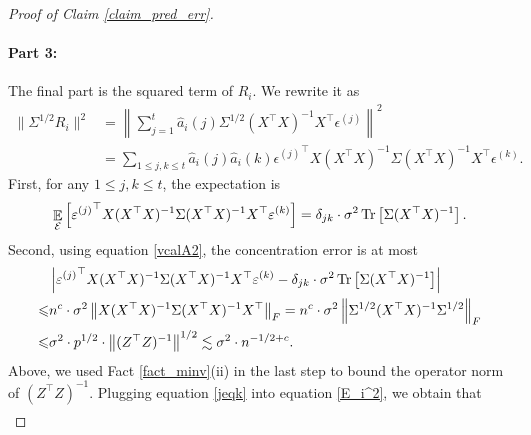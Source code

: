 \begin{proof}[Proof of Claim \ref{claim_pred_err}]
	\paragraph{Part 3:} The final part is the squared term of $R_i$. We rewrite it as
	\begin{align}
	\|\Sigma^{1/2}R_i\|^2 &= \left\|\sum_{j=1}^t \hat{a}_i(j) \Sigma^{1/2}(X^{\top} X)^{-1} X^{\top} \epsilon^{(j)}\right\|^2 \nonumber\\
	& = \sum_{1\le j , k \le t}\hat a_i(j) \hat a_i(k)  {\epsilon^{(j)}}^\top X(X^{\top} X)^{-1}\Sigma (X^{\top} X)^{-1} X^{\top} {\epsilon^{(k)}}.\label{E_i^2}
	\end{align}	
	First, for any $1 \le j, k \le t$, the expectation is
	$$\mathop{\mathbb{E}}_{\mathcal E}\left[ {\varepsilon^{(j)}}^\top X(X^{\top} X)^{-1}\Sigma (X^{\top} X)^{-1} X^{\top} \varepsilon^{(k)} \right]=\delta_{jk}\cdot \sigma^2\operatorname{Tr}\left[\Sigma(X^\top X)^{-1}\right] .$$
	Second, using equation \eqref{vcalA2}, the concentration error is at most
	\begin{align}
	& \left|{\varepsilon^{(j)}}^\top X(X^{\top} X)^{-1}\Sigma (X^{\top} X)^{-1} X^{\top} {\varepsilon^{(k)}} -\delta_{jk}\cdot \sigma^2\operatorname{Tr}\left[\Sigma(X^\top X)^{-1}\right]\right|\nonumber \\
	\leqslant &n^c\cdot \sigma^2  \left\| X(X^{\top} X)^{-1}\Sigma (X^{\top} X)^{-1} X^{\top}  \right\|_{F}   = n^c\cdot \sigma^2  \left\| \Sigma^{1/2}(X^{\top} X)^{-1}\Sigma^{1/2} \right\|_{F} \nonumber\\
	  \leqslant &\sigma^2 \cdot p^{1/2} \cdot  \left\| (Z^{\top} Z)^{-1} \right\|^{1/2} \lesssim \sigma^2 \cdot n^{-1/2+c}. \label{jeqk}
	\end{align}
	Above, we used Fact \ref{fact_minv}(ii) in the last step to bound the operator norm of $(Z^{\top} Z)^{-1}$.
	Plugging equation \eqref{jeqk} into equation \eqref{E_i^2}, we obtain that 
	\begin{align*}

\end{align*}
\end{proof}
